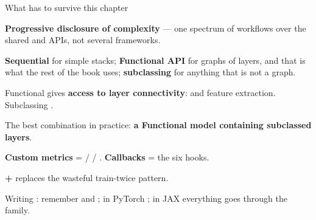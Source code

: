 \documentclass[aspectratio=169,11pt,t]{beamer}
\begin{document}
\begin{frame}[shrink=25]{What has to survive this chapter}
\begin{isteps}
\item \textbf{Progressive disclosure of complexity} --- one spectrum of workflows over the shared  and  APIs, not several frameworks.
\item \textbf{Sequential} for simple stacks; \textbf{Functional API} for graphs of layers, and that is what the rest of the book uses; \textbf{subclassing} for anything that is not a graph.
\item Functional gives \textbf{access to layer connectivity}:  and feature extraction. Subclassing .
\item The best combination in practice: \textbf{a Functional model containing subclassed layers}.
\item \textbf{Custom metrics} =  /  / . \textbf{Callbacks} = the six  hooks.
\item \textbf{ + } replaces the wasteful train-twice pattern.
\item Writing : remember \textbf{} and \textbf{}; in PyTorch \textbf{}; in JAX everything goes through the \textbf{} family.
\end{isteps}
\vskip 4pt
\vskip 2pt
\end{frame}
\end{document}
